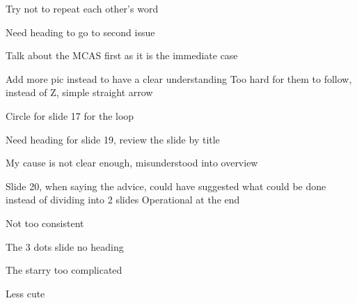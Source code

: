 \documentclass[12pt]{report}
\begin{document}
Try not to repeat each other's word 

Need heading to go to second issue 

Talk about the MCAS first as it is the immediate case 

Add more pic instead to have a clear understanding 
Too hard for them to follow, instead of Z, simple straight arrow 

Circle for slide 17 for the loop 

Need heading for slide 19, review the slide by title 


My cause is not clear enough, misunderstood into overview 

Slide 20, when saying the advice, could have suggested what could be done instead of dividing into 2 slides 
Operational at the end 

Not too consistent

The 3 dots slide no heading 

The starry too complicated 

Less cute
\end{document}

